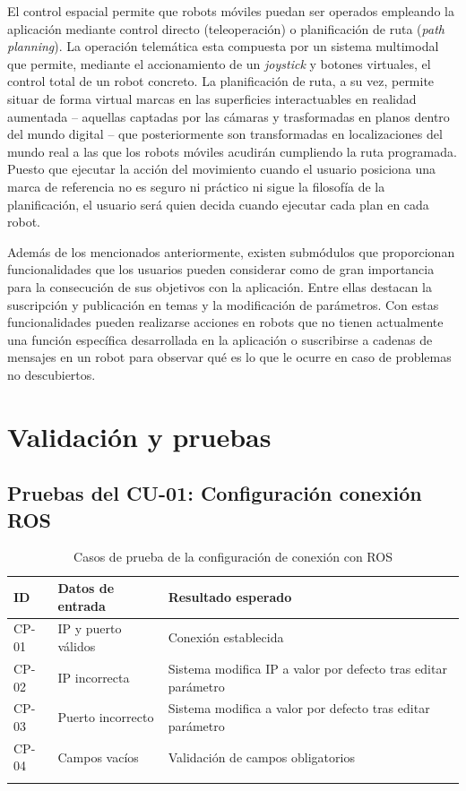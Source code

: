 El control espacial permite que robots móviles puedan ser operados empleando la aplicación mediante control directo (teleoperación) o planificación de ruta (\textit{path planning}).
La operación telemática esta compuesta por un sistema multimodal que permite, mediante el accionamiento de un \textit{joystick} y botones virtuales, el control total
de un robot concreto.
La planificación de ruta, a su vez, permite situar de forma virtual marcas en las superficies interactuables en realidad aumentada -- aquellas captadas por las cámaras y 
trasformadas en planos dentro del mundo digital -- que posteriormente son transformadas en localizaciones del mundo real a las que los robots móviles acudirán cumpliendo la ruta 
programada. Puesto que ejecutar la acción del movimiento cuando el usuario posiciona una marca de referencia no es seguro ni práctico ni sigue la filosofía de la planificación, 
el usuario será quien decida cuando ejecutar cada plan en cada robot.

Además de los mencionados anteriormente, existen submódulos que proporcionan funcionalidades que los usuarios pueden considerar como de gran importancia para 
la consecución de sus objetivos con la aplicación. Entre ellas destacan la suscripción y publicación en temas y la modificación de parámetros. Con estas funcionalidades
pueden realizarse acciones en robots que no tienen actualmente una función específica desarrollada en la aplicación o suscribirse a cadenas de mensajes en un robot para observar
qué es lo que le ocurre en caso de problemas no descubiertos.

\newpage
\section{Validación y pruebas}

\subsection{Pruebas del CU-01: Configuración conexión ROS}
\begin{longtable}{|p{1.5cm}|p{4cm}|p{4cm}|}
\hline
\textbf{ID} & \textbf{Datos de entrada} & \textbf{Resultado esperado} \\
\hline
CP-01 & IP y puerto válidos & Conexión establecida \\
\hline
CP-02 & IP incorrecta & Sistema modifica IP a valor por defecto tras editar parámetro \\
\hline
CP-03 & Puerto incorrecto & Sistema modifica a valor por defecto tras editar parámetro \\
\hline
CP-04 & Campos vacíos & Validación de campos obligatorios \\
\hline
\caption{Casos de prueba de la configuración de conexión con ROS}
\end{longtable}


